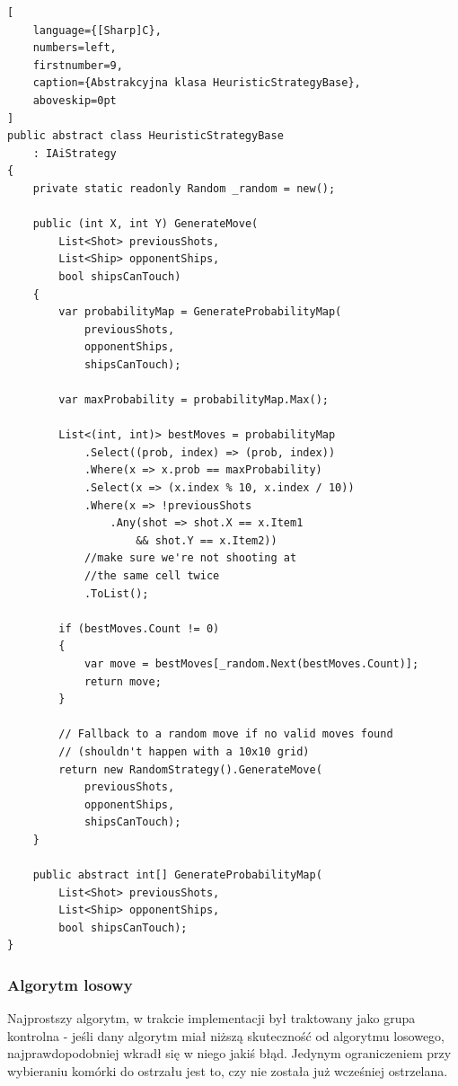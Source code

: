 \begin{addmargin}[10mm]{0mm}
\begin{lstlisting}[
    language={[Sharp]C},
    numbers=left,
    firstnumber=9,
    caption={Abstrakcyjna klasa HeuristicStrategyBase},
    aboveskip=0pt
]
public abstract class HeuristicStrategyBase
    : IAiStrategy
{
    private static readonly Random _random = new();

    public (int X, int Y) GenerateMove(
        List<Shot> previousShots,
        List<Ship> opponentShips,
        bool shipsCanTouch)
    {
        var probabilityMap = GenerateProbabilityMap(
            previousShots,
            opponentShips,
            shipsCanTouch);

        var maxProbability = probabilityMap.Max();

        List<(int, int)> bestMoves = probabilityMap
            .Select((prob, index) => (prob, index))
            .Where(x => x.prob == maxProbability)
            .Select(x => (x.index % 10, x.index / 10))
            .Where(x => !previousShots
                .Any(shot => shot.X == x.Item1
                    && shot.Y == x.Item2))
            //make sure we're not shooting at
            //the same cell twice
            .ToList();

        if (bestMoves.Count != 0)
        {
            var move = bestMoves[_random.Next(bestMoves.Count)];
            return move;
        }

        // Fallback to a random move if no valid moves found
        // (shouldn't happen with a 10x10 grid)
        return new RandomStrategy().GenerateMove(
            previousShots,
            opponentShips,
            shipsCanTouch);
    }

    public abstract int[] GenerateProbabilityMap(
        List<Shot> previousShots,
        List<Ship> opponentShips,
        bool shipsCanTouch);
}
\end{lstlisting}
\end{addmargin}

\subsubsection{Algorytm losowy}
Najprostszy algorytm, w trakcie implementacji był traktowany jako grupa kontrolna - jeśli dany algorytm miał niższą skuteczność od algorytmu losowego, najprawdopodobniej wkradł się w niego jakiś błąd. Jedynym ograniczeniem przy wybieraniu komórki do ostrzału jest to, czy nie została już wcześniej ostrzelana.

